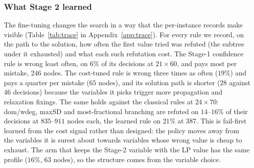 \documentclass[final,5p,times,twocolumn,authoryear]{elsarticle}
\begin{document}
\subsubsection{What Stage 2 learned}
The fine-tuning changes the search in a way that the per-instance records make visible (Table~\ref{tab:trace} in Appendix~\ref{app:trace}). For every rule we record, on the path to the solution, how often the first value tried was refuted (the subtree under it exhausted) and what each such refutation cost. The Stage-1 confidence rule is wrong least often, on $6\%$ of its decisions at $21\times60$, and pays most per mistake, $246$ nodes. The cost-tuned rule is wrong three times as often ($19\%$) and pays a quarter per mistake ($65$ nodes), and its solution path is shorter ($28$ against $46$ decisions) because the variables it picks trigger more propagation and relaxation fixings. The same holds against the classical rules at $24\times70$: dom/wdeg, maxSD and most-fractional branching are refuted on $14$--$16\%$ of their decisions at $835$--$911$ nodes each, the learned rule on $21\%$ at $387$. This is fail-first \citep{haralick1980increasing} learned from the cost signal rather than designed: the policy moves away from the variables it is surest about towards variables whose wrong value is cheap to exhaust. The arm that keeps the Stage-2 variable with the LP value has the same profile ($16\%$, $63$ nodes), so the structure comes from the variable choice.


\end{document}

